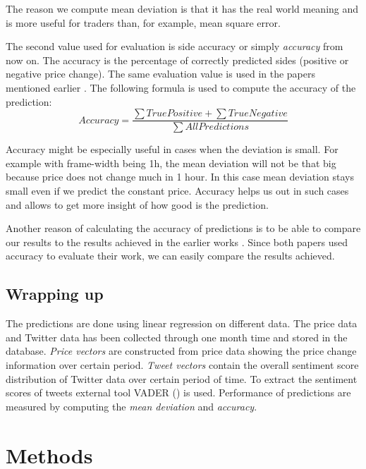 \documentclass[a4paper,11pt,oneside]{article}
\begin{document}
 The reason we compute mean deviation is that it has the real world meaning and is more useful for traders than, for example, mean square error. 
 
 The second value used for evaluation is side accuracy or simply {\it accuracy} from now on. The accuracy is the percentage of correctly predicted sides (positive or negative price change). The same evaluation value is used in the papers mentioned earlier \cite{related1} \cite{related2}. The following formula is used to compute the accuracy of the prediction:
 \begin{equation}\label{accuracy}
 	Accuracy = \frac{\sum True Positive + \sum True Negative}{\sum All Predictions}
 \end{equation}
 
 Accuracy might be especially useful in cases when the deviation is small. For example with frame-width being 1h, the mean deviation will not be that big because price does not change much in 1 hour. In this case mean deviation stays small even if we predict the constant price. Accuracy helps us out in such cases and allows to get more insight of how good is the prediction.
 
 Another reason of calculating the accuracy of predictions is to be able to compare our results to the results achieved in the earlier works \cite{related1} \cite{related2}. Since both papers used accuracy to evaluate their work, we can easily compare the results achieved.
 
 \subsection{Wrapping up}
 
 The predictions are done using linear regression on different data. The price data and Twitter data has been collected through one month time and stored in the database. {\it Price vectors} are constructed from price data showing the price change information over certain period. {\it Tweet vectors} contain the overall sentiment score distribution of Twitter data over certain period of time. To extract the sentiment scores of tweets external tool VADER (\cite{vader}) is used. Performance of predictions are measured by computing the {\it mean deviation} and {\it accuracy}.
 
 \section{Methods}
 
\end{document}
